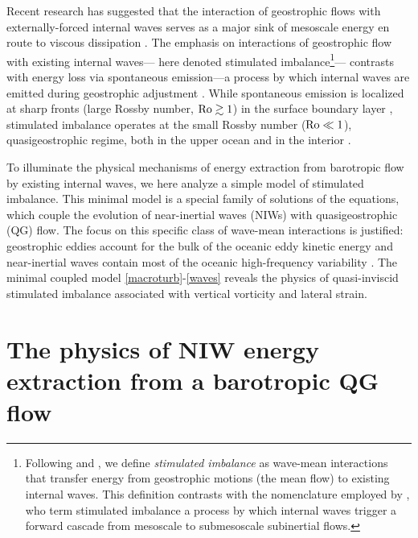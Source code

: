 \documentclass{jfm}
\begin{document}
Recent research has suggested that the interaction
of geostrophic flows with externally-forced internal waves serves
as a major sink of mesoscale energy en route to viscous dissipation
\citep{xie_vanneste2015,taylor_straub2016,wagner_young2016,barkan_etal2016}.
The emphasis on interactions of geostrophic flow with existing internal waves---
here denoted stimulated imbalance\footnote{Following \cite{xie_vanneste2015} and
\cite{wagner_young2016}, we define
\textit{stimulated imbalance} as wave-mean interactions that transfer energy from
geostrophic motions (the mean flow) to existing internal
waves. This definition contrasts with the nomenclature employed by
\cite{barkan_etal2016}, who term stimulated imbalance a process by which
internal waves trigger a forward cascade from mesoscale to submesoscale subinertial flows.}---
contrasts with energy loss via spontaneous emission---a process
by which internal waves are emitted during geostrophic adjustment
\citep[e.g., ][]{shakespeare_hogg2017}. While spontaneous emission is localized
at sharp fronts (large Rossby number, $\mathrm{Ro}\gtrsim 1$) in the surface boundary
layer \citep[e.g., ][]{shakespeare_hogg2017}, stimulated imbalance operates at
the small Rossby number ($\mathrm{Ro}\ll 1$), quasigeostrophic regime, both in the upper
ocean and in the interior \citep[e.g., ][]{xie_vanneste2015}.

To illuminate the physical mechanisms of energy extraction from
barotropic flow by existing internal waves, we here analyze a
simple model of stimulated imbalance. This minimal model is a special
family of solutions of the \cite{xie_vanneste2015} equations, which couple the
evolution of near-inertial waves (NIWs) with quasigeostrophic (QG) flow. The
focus on this specific class of wave-mean interactions is justified:  geostrophic
eddies account for the bulk of the oceanic eddy kinetic energy \cite[$90\%$,][]{ferrari_wunsch2009} and
near-inertial waves contain most of the oceanic high-frequency variability
\citep{alford_etal2016}. The minimal coupled model \eqref{macroturb}-\eqref{waves}
reveals the physics of quasi-inviscid stimulated imbalance associated
with vertical vorticity and lateral strain.

\section{The physics of NIW energy extraction from a barotropic QG flow}
\end{document}
